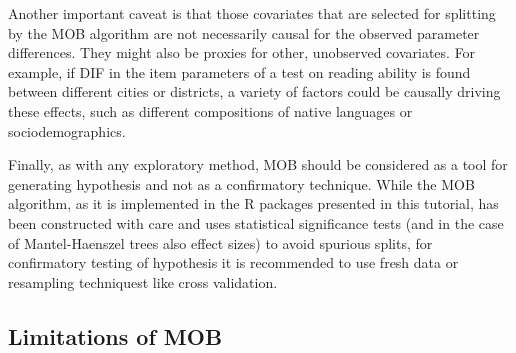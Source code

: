 \documentclass[doc,floatsintext,natbib]{apa7}
\begin{document}
Another important caveat is that those covariates that are selected for splitting by the MOB algorithm are not necessarily causal for the observed parameter differences. They might also be proxies for other, unobserved covariates. For example, if DIF in the item parameters of a test on reading ability is found between different cities or districts, a variety of factors could be causally driving these effects, such as different compositions of native languages or sociodemographics. 

Finally, as with any exploratory method, MOB should be considered as a tool for generating hypothesis and not as a confirmatory technique. While the MOB algorithm, as it is implemented in the R packages presented in this tutorial, has been constructed with care and uses statistical significance tests (and in the case of Mantel-Haenszel trees also effect sizes) to avoid spurious splits, for confirmatory testing of hypothesis it is recommended to use fresh data or resampling techniquest like cross validation.  


\subsection{Limitations of MOB}
\end{document}
